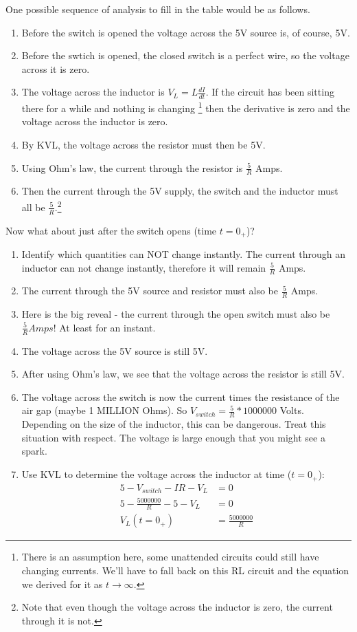 One possible sequence of analysis to fill in the table would be as follows.
\begin{enumerate}
\item Before the switch is opened the voltage across the 5V source is, of course, 5V. 
\item Before the swtich is opened, the closed switch is a perfect wire, so the voltage across it is zero. 
\item The voltage across the inductor is $V_L=L\frac{dI}{dt}$. If the circuit has been sitting there for a while and nothing is changing \footnote{There is an assumption here, some unattended circuits could still have changing currents. We'll have to fall back on this RL circuit and the equation we derived for it as $t \rightarrow \infty$.} then the derivative is zero and the voltage across the inductor is zero. 
\item By KVL, the voltage across the resistor must then be 5V.
\item Using Ohm's law, the current through the resistor is $\frac{5}{R}$ Amps.
\item Then the current through the 5V supply, the switch and the inductor must all be $\frac{5}{R}$.\footnote{Note that even though the voltage across the inductor is zero, the current through it is not.}
\end{enumerate}

Now what about just after the switch opens (time $t=0_{+}$)?\\
\begin{enumerate}
\item Identify which quantities can NOT change instantly. The current through an inductor can not change instantly, therefore it will remain $\frac{5}{R}$ Amps.
\item The current through the 5V source and resistor must also be $\frac{5}{R}$ Amps.
\item Here is the big reveal - the current through the open switch must also be $\frac{5}{R} Amps$! At least for an instant.
\item The voltage across the 5V source is still 5V.
\item After using Ohm's law, we see that the voltage across the resistor is still 5V.
\item The voltage across the switch is now the current times the resistance of the air gap (maybe 1 MILLION Ohms). So $V_{switch}=\frac{5}{R}*1000000$ Volts. Depending on the size of the inductor, this can be dangerous. Treat this situation with respect. The voltage is large enough that you might see a spark.
\item Use KVL to determine the voltage across the inductor at time ($t=0_+$):
\begin{align*}
5-V_{switch}-IR-V_L&=0\\
5-\frac{5000000}{R}-5-V_L&=0\\
V_L(t=0_+)&=\frac{5000000}{R}
\end{align*}
\end{enumerate}

